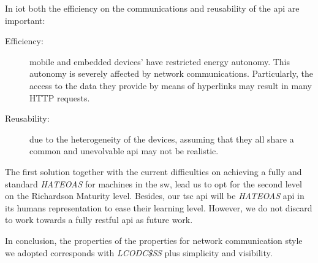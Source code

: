 
In \ac{iot} both the efficiency on the communications and reusability of the \ac{api} are important:
\begin{description}
  \item[Efficiency:] mobile and embedded devices' have restricted energy autonomy.
                    This autonomy is severely affected by network communications. %
                    Particularly, the access to the data they provide by means of hyperlinks may result in many HTTP requests. %
  \item[Reusability:] due to the heterogeneity of the devices, assuming that they all share a common and unevolvable \ac{api} may not be realistic. %
\end{description}
The first solution together with the current difficulties on achieving a fully and standard \emph{HATEOAS} for machines in the \ac{sw}, lead us to opt for the second level on the Richardson Maturity level.
Besides, our \ac{tsc} \ac{api} will be \emph{HATEOAS} \ac{api} in its humans representation to ease their learning level.%
However, we do not discard to work towards a fully \ac{rest}ful \ac{api} as future work.


In conclusion, the properties of the properties for network communication style we adopted corresponds with \emph{LCODC\$SS} plus simplicity and visibility. %





